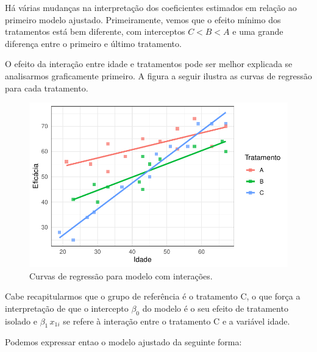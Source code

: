 \documentclass[
  letterpaper,
  DIV=11,
  numbers=noendperiod]{scrartcl}
\begin{document}
Há várias mudanças na interpretação dos coeficientes estimados em
relação ao primeiro modelo ajustado. Primeiramente, vemos que o efeito
mínimo dos tratamentos está bem diferente, com interceptos \(C<B<A\) e
uma grande diferença entre o primeiro e último tratamento.

O efeito da interação entre idade e tratamentos pode ser melhor
explicada se analisarmos graficamente primeiro. A figura a seguir
ilustra as curvas de regressão para cada tratamento.

\begin{figure}

{\centering \includegraphics{lista2_files/figure-pdf/unnamed-chunk-1-1.pdf}

}

\caption{Curvas de regressão para modelo com interações.}

\end{figure}

Cabe recapitularmos que o grupo de referência é o tratamento C, o que
força a interpretação de que o intercepto \(\beta_0\) do modelo é o seu
efeito de tratamento isolado e \(\beta_1 \, x_{1i}\) se refere à
interação entre o tratamento C e a variável idade.

Podemos expressar entao o modelo ajustado da seguinte forma:
\end{document}
